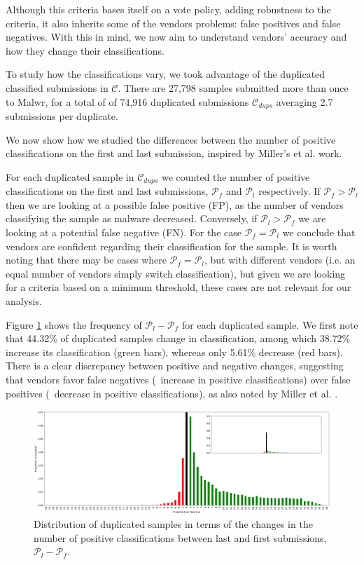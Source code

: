 Although this criteria bases itself on a vote policy, adding robustness to the criteria, it also inherits some of the vendors problems: false positives and false negatives. With this in mind, we now aim to understand vendors' accuracy and how they change their classifications.

To study how the classifications vary, we took advantage of the duplicated classified submissions in $\mathcal{C}$. There are 27,798 samples submitted more than once to Malwr, for a total of of 74,916
duplicated submissions $\mathcal{C}_{dups}$ averaging 2.7 submissions per
duplicate.

We now show how we studied the differences between the number of positive classifications on the first and last submission, inspired by Miller's et al. \cite{miller:rev_int} work.

For each duplicated sample in $\mathcal{C}_{dups}$ we counted the number
of positive classifications on the first and last submissions, $\mathcal{P}_f$ and $\mathcal{P}_l$ respectively.
If $\mathcal{P}_f > \mathcal{P}_l$ then we are looking
at a possible false positive (FP), as the number of vendors
classifying the sample as malware decreased.
Conversely, if
$\mathcal{P}_l > \mathcal{P}_f$ we are looking at a potential false negative (FN).
For the case $\mathcal{P}_f = \mathcal{P}_l$ we conclude that vendors are confident regarding their classification for the sample. It is worth noting that there may be cases where $\mathcal{P}_f = \mathcal{P}_l$, but with different vendors (i.e. an equal number of vendors simply switch classification), but given we are looking for a criteria based on a minimum threshold, these cases are not relevant for our analysis.

Figure \ref{fig:dups_frequency} shows the frequency of $\mathcal{P}_l-\mathcal{P}_f$ for each duplicated
sample.
We first note that 44.32\% of duplicated samples change in classification, among which 38.72\% increase its classification (green bars), whereas only 5.61\% decrease (red bars).
There is a clear discrepancy between positive and negative changes, suggesting that vendors favor false negatives (\ie\ increase in positive classifications) over false positives (\ie\ decrease in positive classifications), as also noted by Miller et al. \cite{miller:rev_int}.

\begin{figure}[!htb]
	\centering
	\includegraphics[width=\textwidth]{Figures/dups_frequency.png}
	\caption[Distribution of duplicated samples.]{Distribution of duplicated samples in terms of the changes in the number of
positive classifications between last and first submissions, $\mathcal{P}_l-\mathcal{P}_f$.}
	\label{fig:dups_frequency}
\end{figure}

